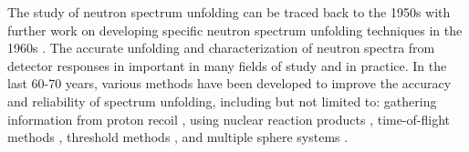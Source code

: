 The study of neutron spectrum unfolding can be traced back to the 1950s \cite{poole1952} with further work on developing specific neutron spectrum unfolding techniques in the 1960s \cite{habiger1964}. The accurate unfolding and characterization of neutron spectra from detector responses in important in many fields of study and in practice. In the last 60-70 years, various methods have been developed to improve the accuracy and reliability of spectrum unfolding, including but not limited to: gathering information from proton recoil \cite{thomas1999}, using nuclear reaction products \cite{weyrauch1993}, time-of-flight methods \cite{tagliente1998}, threshold methods \cite{hecker1977}, and multiple sphere systems \cite{bonner1960}.